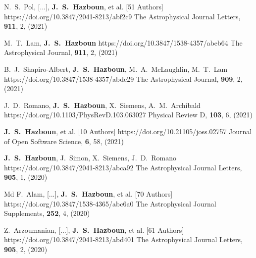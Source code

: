          {N.~S.~{Pol}, [...], \textbf{J.~S.~{Hazboun}}, et al. [51 Authors]}
         {https://doi.org/10.3847/2041-8213/abf2c9}
         {{The Astrophysical Journal Letters}, \textbf{911}, 2, (2021)}

         {M.~T.~{Lam}, \textbf{J.~S.~Hazboun}}
         {https://doi.org/10.3847/1538-4357/abeb64}
         {{The Astrophysical Journal}, \textbf{911}, 2, (2021)}

         {B.~J.~Shapiro-Albert, \textbf{J.~S.~Hazboun}, M.~A.~{McLaughlin}, M.~T.~{Lam}}
         {https://doi.org/10.3847/1538-4357/abdc29}
         {{The Astrophysical Journal}, \textbf{909}, 2, (2021)}

         {J.~D.~{Romano}, \textbf{J.~S.~Hazboun}, X.~{Siemens}, A.~M.~{Archibald}}
         {https://doi.org/10.1103/PhysRevD.103.063027}
         {{Physical Review D}, \textbf{103}, 6, (2021)}

         {\textbf{J.~S.~{Hazboun}}, et al. [10 Authors]}
         {https://doi.org/10.21105/joss.02757}
         {{Journal of Open Software Science}, \textbf{6}, 58, (2021)}

         {\textbf{J.~S.~Hazboun}, J.~{Simon}, X.~{Siemens}, J.~D.~{Romano}}
         {https://doi.org/10.3847/2041-8213/abca92}
         {{The Astrophysical Journal Letters}, \textbf{905}, 1, (2020)}

         {Md F.~{Alam}, [...], \textbf{J.~S.~{Hazboun}}, et al. [70 Authors]}
         {https://doi.org/10.3847/1538-4365/abc6a0}
         {{The Astrophysical Journal Supplements}, \textbf{252}, 4, (2020)}

         {Z.~{Arzoumanian}, [...], \textbf{J.~S.~{Hazboun}}, et al. [61 Authors]}
         {https://doi.org/10.3847/2041-8213/abd401}
         {{The Astrophysical Journal Letters}, \textbf{905}, 2, (2020)}

